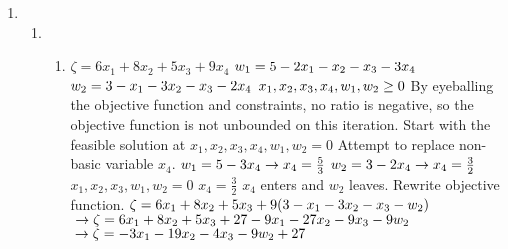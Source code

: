 \documentclass{article}
\begin{document}
\begin{enumerate}
\begin{enumerate} [label = \roman*]
            \newline This is a feasible dictionary, so we can move on to simplex method.
            \newline A feasible solution is:
            $\\ x_0, x_1, x_2, x_3, x_4, w_1, w_2 = 0$
            \newline Therefore, this problem is feasible.
            \newline When picking the highest bound, the ratio is $\frac{3}{3}$. Since the ratio is positive, this problem is bounded.
    \end{enumerate}
    \newpage
    \item \begin{enumerate} %
        \item \begin{enumerate} [label = \roman*]
            \item
                $\zeta = 6x_1 + 8x_2 + 5x_3 + 9x_4$
                $\\ w_1 = 5 - 2x_1 - x_2 - x_3 - 3x_4$
                $\\ w_2 = 3 - x_1 - 3x_2 - x_3 - 2x_4$
                $\\ x_1, x_2, x_3, x_4, w_1, w_2 \geq 0$
                \newline By eyeballing the objective function and constraints, no ratio is negative, so the objective function is not unbounded on this iteration.
                \newline Start with the feasible solution at $x_1, x_2, x_3, x_4, w_1, w_2 = 0$
                \newline Attempt to replace non-basic variable $x_4$.
                $\\ w_1 = 5 - 3x_4 \to x_4 = \frac{5}{3}$
                $\\ w_2 = 3 - 2x_4 \to x_4 = \frac{3}{2}$
                \newline $x_1, x_2, x_3, w_1, w_2 = 0$
                \newline $x_4 = \frac{3}{2}$
                \newline $x_4$ enters and $w_2$ leaves.
                \newline Rewrite objective function.
                $\\\zeta = 6x_1 + 8x_2 + 5x_3 + 9(3 - x_1 - 3x_2 - x_3 - w_2)$
                $\\\to \zeta = 6x_1 + 8x_2 + 5x_3 + 27 - 9x_1 - 27x_2 - 9x_3 - 9w_2$
                $\\\to \zeta = - 3x_1 - 19x_2 - 4x_3 - 9w_2 + 27$

\end{enumerate}
\end{enumerate}
\end{enumerate}
\end{document}
